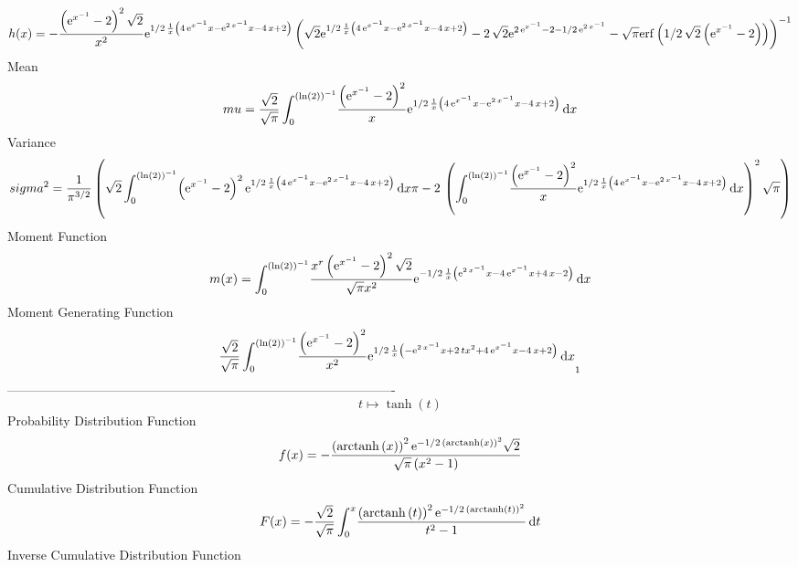 \documentclass[12pt]{article}
\begin{document}
 $$ h(x)=-{\frac { \left( {{\rm e}^{{x}^{-1}}}-2 \right) ^{2}\sqrt {2}}{{x}^{2}
}{{\rm e}^{1/2\,{\frac {1}{x} \left( 4\,{{\rm e}^{{x}^{-1}}}x-{{\rm e}
^{2\,{x}^{-1}}}x-4\,x+2 \right) }}} \left( \sqrt {2}{{\rm e}^{1/2\,{
\frac {1}{x} \left( 4\,{{\rm e}^{{x}^{-1}}}x-{{\rm e}^{2\,{x}^{-1}}}x-
4\,x+2 \right) }}}-2\,\sqrt {2}{{\rm e}^{2\,{{\rm e}^{{x}^{-1}}}-2-1/2
\,{{\rm e}^{2\,{x}^{-1}}}}}-\sqrt {\pi}{\rm erf} \left(1/2\,\sqrt {2}
 \left( {{\rm e}^{{x}^{-1}}}-2 \right) \right) \right) ^{-1}}
$$Mean 
 $$ mu={\frac {\sqrt {2}}{\sqrt {\pi}}\int_{0}^{ \left( \ln  \left( 2
 \right)  \right) ^{-1}}\!{\frac { \left( {{\rm e}^{{x}^{-1}}}-2
 \right) ^{2}}{x}{{\rm e}^{1/2\,{\frac {1}{x} \left( 4\,{{\rm e}^{{x}^
{-1}}}x-{{\rm e}^{2\,{x}^{-1}}}x-4\,x+2 \right) }}}}\,{\rm d}x}
$$ Variance 
 $$ sigma^2 = {\frac {1}{{\pi}^{3/2}} \left( \sqrt {2}\int_{0}^{ \left( \ln  \left( 
2 \right)  \right) ^{-1}}\! \left( {{\rm e}^{{x}^{-1}}}-2 \right) ^{2}
{{\rm e}^{1/2\,{\frac {1}{x} \left( 4\,{{\rm e}^{{x}^{-1}}}x-{{\rm e}^
{2\,{x}^{-1}}}x-4\,x+2 \right) }}}\,{\rm d}x\pi-2\, \left( \int_{0}^{
 \left( \ln  \left( 2 \right)  \right) ^{-1}}\!{\frac { \left( {
{\rm e}^{{x}^{-1}}}-2 \right) ^{2}}{x}{{\rm e}^{1/2\,{\frac {1}{x}
 \left( 4\,{{\rm e}^{{x}^{-1}}}x-{{\rm e}^{2\,{x}^{-1}}}x-4\,x+2
 \right) }}}}\,{\rm d}x \right) ^{2}\sqrt {\pi} \right) }
$$Moment Function 
 $$ m(x) = \int_{0}^{ \left( \ln  \left( 2 \right)  \right) ^{-1}}\!{\frac {{x}^{
r} \left( {{\rm e}^{{x}^{-1}}}-2 \right) ^{2}\sqrt {2}}{\sqrt {\pi}{x}
^{2}}{{\rm e}^{-1/2\,{\frac {1}{x} \left( {{\rm e}^{2\,{x}^{-1}}}x-4\,
{{\rm e}^{{x}^{-1}}}x+4\,x-2 \right) }}}}\,{\rm d}x
$$ Moment Generating Function 
 $${\frac {\sqrt {2}}{\sqrt {\pi}}\int_{0}^{ \left( \ln  \left( 2
 \right)  \right) ^{-1}}\!{\frac { \left( {{\rm e}^{{x}^{-1}}}-2
 \right) ^{2}}{{x}^{2}}{{\rm e}^{1/2\,{\frac {1}{x} \left( -{{\rm e}^{
2\,{x}^{-1}}}x+2\,t{x}^{2}+4\,{{\rm e}^{{x}^{-1}}}x-4\,x+2 \right) }}}
}\,{\rm d}x}_{{1}}
$$-------------------------------------------------------------------------------------------  \\$$t\mapsto \tanh \left( t \right) 
$$Probability Distribution Function 
$$  f(x)=-{\frac { \left( {\rm arctanh} \left(x\right) \right) ^{2}{{\rm e}^{-1
/2\, \left( {\rm arctanh} \left(x\right) \right) ^{2}}}\sqrt {2}}{
\sqrt {\pi} \left( {x}^{2}-1 \right) }}
$$Cumulative Distribution Function  
 $$F(x)=-{\frac {\sqrt {2}}{\sqrt {\pi}}\int_{0}^{x}\!{\frac { \left( 
{\rm arctanh} \left(t\right) \right) ^{2}{{\rm e}^{-1/2\, \left( 
{\rm arctanh} \left(t\right) \right) ^{2}}}}{{t}^{2}-1}}\,{\rm d}t}
$$ Inverse Cumulative Distribution Function 
\end{document}
